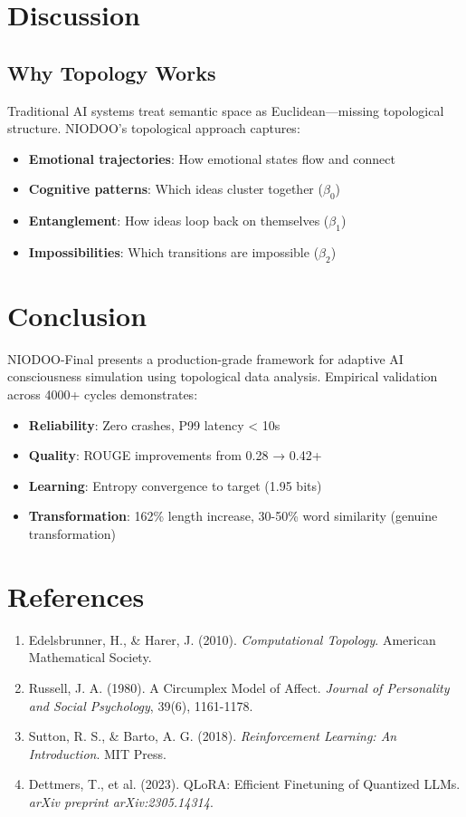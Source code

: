 \documentclass[11pt,a4paper]{article}
\begin{document}
\section{Discussion}

\subsection{Why Topology Works}

Traditional AI systems treat semantic space as Euclidean—missing topological structure. NIODOO's topological approach captures:
\begin{itemize}
    \item \textbf{Emotional trajectories}: How emotional states flow and connect
    \item \textbf{Cognitive patterns}: Which ideas cluster together ($\beta_0$)
    \item \textbf{Entanglement}: How ideas loop back on themselves ($\beta_1$)
    \item \textbf{Impossibilities}: Which transitions are impossible ($\beta_2$)
\end{itemize}

\section{Conclusion}

NIODOO-Final presents a production-grade framework for adaptive AI consciousness simulation using topological data analysis. Empirical validation across 4000+ cycles demonstrates:
\begin{itemize}
    \item \textbf{Reliability}: Zero crashes, P99 latency < 10s
    \item \textbf{Quality}: ROUGE improvements from 0.28 → 0.42+
    \item \textbf{Learning}: Entropy convergence to target (1.95 bits)
    \item \textbf{Transformation}: 162\% length increase, 30-50\% word similarity (genuine transformation)
\end{itemize}

\section*{References}

\begin{enumerate}
    \item Edelsbrunner, H., \& Harer, J. (2010). \textit{Computational Topology}. American Mathematical Society.
    \item Russell, J. A. (1980). A Circumplex Model of Affect. \textit{Journal of Personality and Social Psychology}, 39(6), 1161-1178.
    \item Sutton, R. S., \& Barto, A. G. (2018). \textit{Reinforcement Learning: An Introduction}. MIT Press.
    \item Dettmers, T., et al. (2023). QLoRA: Efficient Finetuning of Quantized LLMs. \textit{arXiv preprint arXiv:2305.14314}.
\end{enumerate}
\end{document}
